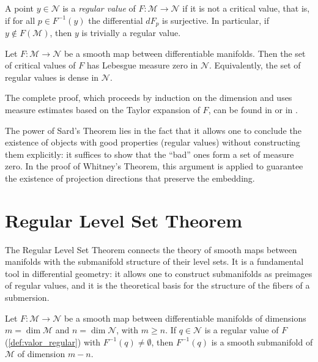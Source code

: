 \begin{definition}\label{def:valor_regular}
A point $y \in \mathcal{N}$ is a \textit{regular value} of $F: \mathcal{M} \to \mathcal{N}$ if it is not a critical value, that is, if for all $p \in F^{-1}(y)$ the differential $dF_p$ is surjective. In particular, if $y \notin F(\mathcal{M})$, then $y$ is trivially a regular value.
\end{definition}

\begin{theorem}\label{thm:sard}
Let $F: \mathcal{M} \to \mathcal{N}$ be a smooth map between differentiable manifolds. Then the set of critical values of $F$ has Lebesgue measure zero in $\mathcal{N}$. Equivalently, the set of regular values is dense in $\mathcal{N}$.
\end{theorem}

The complete proof, which proceeds by induction on the dimension and uses measure estimates based on the Taylor expansion of $F$, can be found in \citet[Chapter 6, Theorem 6.10]{lee2012introduction} or in \citet[Chapter 3]{milnor1965topology}.

\begin{remark}
The power of Sard's Theorem lies in the fact that it allows one to conclude the existence of objects with good properties (regular values) without constructing them explicitly: it suffices to show that the ``bad'' ones form a set of measure zero. In the proof of Whitney's Theorem, this argument is applied to guarantee the existence of projection directions that preserve the embedding.
\end{remark}

\section{Regular Level Set Theorem}\label{sec:nivel_regular}

The Regular Level Set Theorem connects the theory of smooth maps between manifolds with the submanifold structure of their level sets. It is a fundamental tool in differential geometry: it allows one to construct submanifolds as preimages of regular values, and it is the theoretical basis for the structure of the fibers of a submersion.

\begin{theorem}\label{thm:nivel_regular}
Let $F: \mathcal{M} \to \mathcal{N}$ be a smooth map between differentiable manifolds of dimensions $m = \dim \mathcal{M}$ and $n = \dim \mathcal{N}$, with $m \geq n$. If $q \in \mathcal{N}$ is a regular value of $F$ (\autoref{def:valor_regular}) with $F^{-1}(q) \neq \emptyset$, then $F^{-1}(q)$ is a smooth submanifold of $\mathcal{M}$ of dimension $m - n$.
\end{theorem}

